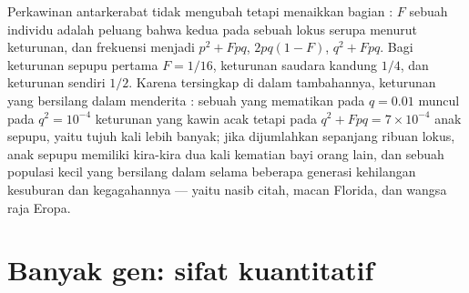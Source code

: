 \begin{proposition}\label{prop:b2:population-genetics:inbreeding}
Perkawinan antarkerabat tidak mengubah  tetapi
menaikkan bagian : \emph{} $F$ sebuah
individu adalah peluang bahwa kedua  pada sebuah lokus serupa
menurut keturunan, dan frekuensi  menjadi $p^{2} + Fpq$,
$2pq(1 - F)$, $q^{2} + Fpq$. Bagi keturunan sepupu pertama $F = 1/16$,
keturunan saudara kandung $1/4$, dan keturunan  sendiri
$1/2$. Karena    tersingkap di dalam
 tambahannya, keturunan yang bersilang dalam menderita
\emph{}: sebuah   yang mematikan pada $q = 0.01$ muncul pada $q^{2} = 10^{-4}$ keturunan yang kawin acak tetapi
pada $q^{2} + Fpq = 7\times 10^{-4}$ anak sepupu, yaitu tujuh kali
lebih banyak; jika dijumlahkan sepanjang ribuan lokus, anak sepupu
memiliki kira-kira dua kali kematian bayi orang lain, dan sebuah
populasi kecil yang bersilang dalam selama beberapa generasi kehilangan
kesuburan dan kegagahannya --- yaitu nasib citah, macan Florida, dan
wangsa raja Eropa.
\end{proposition}

\section{Banyak gen: sifat kuantitatif}

